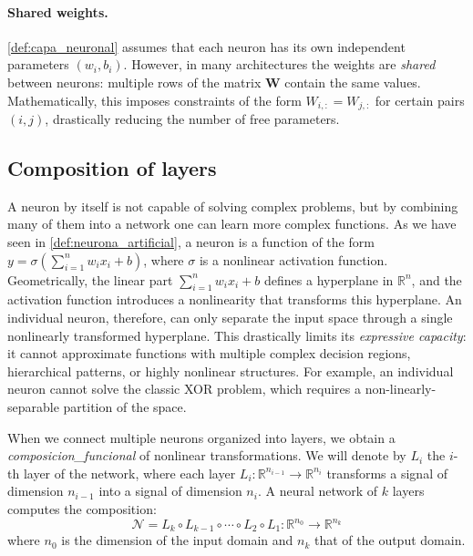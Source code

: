\paragraph{Shared weights.}

\autoref{def:capa_neuronal} assumes that each neuron has its own independent parameters $(w_i, b_i)$. However, in many architectures the weights are \textit{shared} between neurons: multiple rows of the matrix $\mathbf{W}$ contain the same values. Mathematically, this imposes constraints of the form $W_{i,:} = W_{j,:}$ for certain pairs $(i,j)$, drastically reducing the number of free parameters.

\subsection{Composition of layers}

A neuron by itself is not capable of solving complex problems, but by combining many of them into a network one can learn more complex functions. As we have seen in \autoref{def:neurona_artificial}, a neuron is a function of the form $y = \sigma\left(\sum_{i=1}^n w_i x_i + b\right)$, where $\sigma$ is a nonlinear activation function. Geometrically, the linear part $\sum_{i=1}^n w_i x_i + b$ defines a hyperplane in $\mathbb{R}^n$, and the activation function introduces a nonlinearity that transforms this hyperplane. An individual neuron, therefore, can only separate the input space through a single nonlinearly transformed hyperplane. This drastically limits its \textit{expressive capacity}: it cannot approximate functions with multiple complex decision regions, hierarchical patterns, or highly nonlinear structures. For example, an individual neuron cannot solve the classic XOR problem, which requires a non-linearly-separable partition of the space.

When we connect multiple neurons organized into layers, we obtain a \textit{\gls{composicion_funcional}} of nonlinear transformations. We will denote by $L_i$ the $i$-th layer of the network, where each layer $L_i: \mathbb{R}^{n_{i-1}} \to \mathbb{R}^{n_i}$ transforms a signal of dimension $n_{i-1}$ into a signal of dimension $n_i$. A neural network of $k$ layers computes the composition:
\[
\mathcal{N} = L_k \circ L_{k-1} \circ \cdots \circ L_2 \circ L_1: \mathbb{R}^{n_0} \to \mathbb{R}^{n_k}
\]
where $n_0$ is the dimension of the input domain and $n_k$ that of the output domain.

